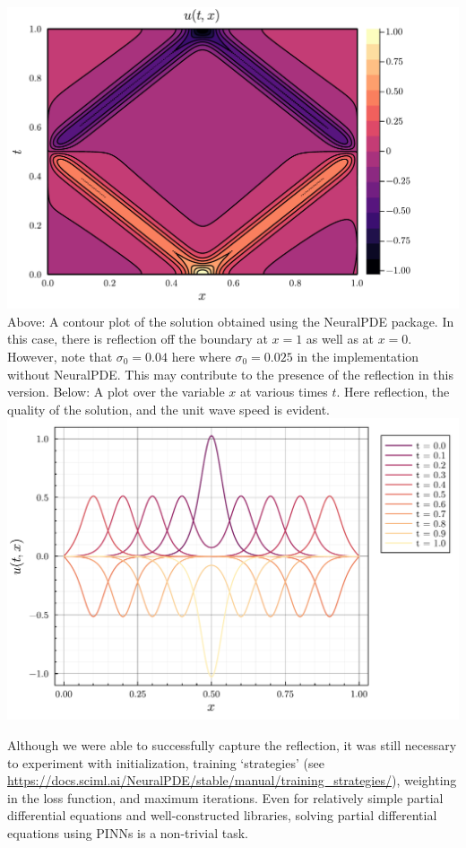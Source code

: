 \documentclass[11pt]{article}
\newcommand{\1}{\mathbf 1}
\begin{document}
\begin{center}
	\includegraphics[width=0.9\linewidth]{fig/nice-wave-NeuralPDE.pdf}
	\\
		Above: A contour plot of the solution obtained using the NeuralPDE package.
		In this case, there is reflection off the boundary at $x = 1$ as well as at $x = 0$.
		However, note that $\sigma_0 = 0.04$ here where $\sigma_0 = 0.025$ in the implementation without NeuralPDE.
		This may contribute to the presence of the reflection in this version.
		Below: A plot over the variable $x$ at various times $t$.
		Here reflection, the quality of the solution, and the unit wave speed is evident.
	\\
	\includegraphics[width=0.9\linewidth]{fig/nice-wave-NeuralPDE-per-t.pdf}
\end{center}
Although we were able to successfully capture the reflection, it was still necessary to experiment with initialization, training `strategies' (see \url{https://docs.sciml.ai/NeuralPDE/stable/manual/training_strategies/}), weighting in the loss function, and maximum iterations.
Even for relatively simple partial differential equations and well-constructed libraries, solving partial differential equations using PINNs is a non-trivial task.
\end{document}
